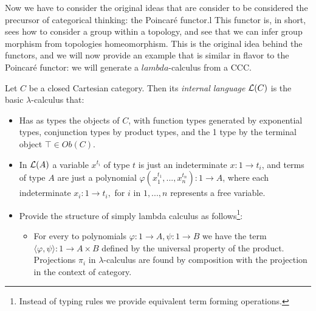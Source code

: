 Now we have to consider the original ideas that are consider to be considered the precursor of categorical thinking: the Poincaré functor.l This functor is, in short,  sees how to consider a group within a topology, and see that we can infer group morphism from topologies homeomorphism. This is the original idea behind the functors, and we will now provide an example that is similar in flavor to the Poincaré functor: we will generate a $lambda$-calculus from a CCC.\\ 



\begin{definition}
  Let $C$ be a closed Cartesian category. Then its \emph{internal language} $\mathcal{L} (C)$ is the basic $\lambda$-calculus that:
  \begin{itemize}
  \item Has as types the objects of $C$, with function types generated by exponential types, conjunction types by product types, and the 1 type by the terminal object $\top \in Ob(C)$.%
  \item In $\mathcal{L}(A)$ a variable $x^{t_i}$ of type $t$ is just an indeterminate  $x:1 \to t_i$, and terms of type $A$ are just a polynomial $\varphi(x_1^{t_1},...,x_n^{t_n}):1 \to A$, where each indeterminate $x_i: 1 \to t_i,$ for $i$ in $1,...,n$ represents a free variable.
  \item Provide the structure of simply lambda calculus as follows\footnote{Instead of typing rules we provide equivalent term forming operations.}:
    \begin{itemize}
    \item For every to polynomials $\varphi: 1 \to A, \psi: 1\to B$ we have the term $\langle \varphi, \psi \rangle: 1 \to A\times B$ defined by the universal property of the product. Projections $\pi_i$ in $\lambda$-calculus are found by composition with the projection in the context of category.

\end{itemize}
\end{itemize}
\end{definition}
